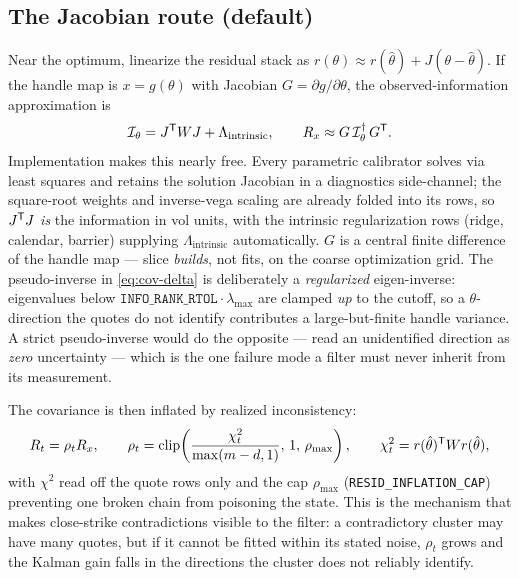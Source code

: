 \documentclass[11pt]{article}
\newcommand{\calI}{\mathcal I}
\begin{document}
\subsection{The Jacobian route (default)}
\label{sec:jacroute}

Near the optimum, linearize the residual stack as
$r(\theta)\approx r(\hat\theta)+J(\theta-\hat\theta)$. If the handle map is
$x=g(\theta)$ with Jacobian $G=\partial g/\partial\theta$, the
observed-information approximation is
\begin{equation}
\calI_\theta=J\T WJ+\Lambda_{\mathrm{intrinsic}},
\qquad
R_x\approx G\,\calI_\theta\pinv\, G\T .
\label{eq:cov-delta}
\end{equation}
Implementation makes this nearly free. Every parametric calibrator solves via
least squares and retains the solution Jacobian in a diagnostics side-channel;
the square-root weights and inverse-vega scaling are already folded into its
rows, so $J^{\mathsf{T}} J$ \emph{is} the information in vol units, with the intrinsic
regularization rows (ridge, calendar, barrier) supplying
$\Lambda_{\mathrm{intrinsic}}$ automatically. $G$ is a central finite
difference of the handle map --- slice \emph{builds}, not fits, on the coarse
optimization grid. The pseudo-inverse in \cref{eq:cov-delta} is deliberately a
\emph{regularized} eigen-inverse: eigenvalues below
$\texttt{INFO\_RANK\_RTOL}\cdot\lambda_{\max}$ are clamped \emph{up} to the
cutoff, so a $\theta$-direction the quotes do not identify contributes a
large-but-finite handle variance. A strict pseudo-inverse would do the
opposite --- read an unidentified direction as \emph{zero} uncertainty --- which
is the one failure mode a filter must never inherit from its measurement.

The covariance is then inflated by realized inconsistency:
\begin{equation}
R_t=\rho_t R_x,\qquad
\rho_t=\operatorname{clip}\!\left(\frac{\chi_t^2}{\max(m-d,1)},\,1,\,
\rho_{\max}\right),
\qquad
\chi_t^2=r(\hat\theta)^{\mathsf{T}} W r(\hat\theta),
\label{eq:resid-inflation}
\end{equation}
with $\chi^2$ read off the quote rows only and the cap $\rho_{\max}$
(\texttt{RESID\_INFLATION\_CAP}) preventing one broken chain from poisoning
the state. This is the mechanism that makes close-strike contradictions
visible to the filter: a contradictory cluster may have many quotes, but if it
cannot be fitted within its stated noise, $\rho_t$ grows and the Kalman gain
falls in the directions the cluster does not reliably identify.
\end{document}
